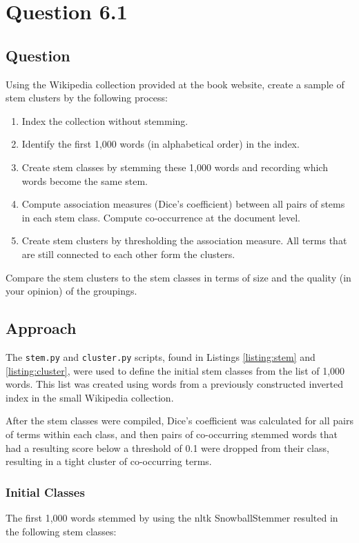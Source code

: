 \section{Question 6.1}

\subsection{Question}
Using the Wikipedia collection provided at the book website, create a sample
of stem clusters by the following process:
\begin{enumerate}
    \item Index the collection without stemming.
    \item Identify the first 1,000 words (in alphabetical order) in the index.
    \item Create stem classes by stemming these 1,000 words and recording which words become the same stem.
    \item Compute association measures (Dice's coefficient) between all pairs of stems in each stem class. Compute co-occurrence at the document level.
    \item Create stem clusters by thresholding the association measure. All terms that are still connected to each other form the clusters.
\end{enumerate}

Compare the stem clusters to the stem classes in terms of size and the quality (in
your opinion) of the groupings.

\subsection{Approach}
The \texttt{stem.py} and \texttt{cluster.py} scripts, found in Listings \ref{listing:stem} and \ref{listing:cluster}, were used to define the initial stem classes from the list of 1,000 words.  This list was created using words from a previously constructed inverted index in the small Wikipedia collection.

After the stem classes were compiled, Dice's coefficient was calculated for all pairs of terms within each class, and then pairs of co-occurring stemmed words that had a resulting score below a threshold of 0.1 were dropped from their class, resulting in a tight cluster of co-occurring terms.  

\subsubsection{Initial Classes}
The first 1,000 words stemmed by using the nltk SnowballStemmer \cite{py:nltk} resulted in the following stem classes:\\


